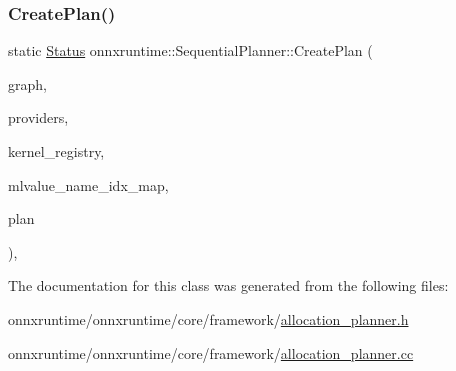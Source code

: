 \subsubsection{\texorpdfstring{Create\+Plan()}{CreatePlan()}\hspace{0.1cm}{\footnotesize\ttfamily [2/2]}}
{\footnotesize\ttfamily static \mbox{\hyperlink{classonnxruntime_1_1common_1_1Status}{Status}} onnxruntime\+::\+Sequential\+Planner\+::\+Create\+Plan (\begin{DoxyParamCaption}\item[{const \mbox{\hyperlink{classonnxruntime_1_1Graph}{onnxruntime\+::\+Graph}} \&}]{graph,  }\item[{const \mbox{\hyperlink{classonnxruntime_1_1ExecutionProviders}{Execution\+Providers}} \&}]{providers,  }\item[{const \mbox{\hyperlink{classonnxruntime_1_1KernelRegistryManager}{Kernel\+Registry\+Manager}} \&}]{kernel\+\_\+registry,  }\item[{const \mbox{\hyperlink{classonnxruntime_1_1MLValueNameIdxMap}{M\+L\+Value\+Name\+Idx\+Map}} \&}]{mlvalue\+\_\+name\+\_\+idx\+\_\+map,  }\item[{std\+::unique\+\_\+ptr$<$ \mbox{\hyperlink{structonnxruntime_1_1SequentialExecutionPlan}{Sequential\+Execution\+Plan}} $>$ \&}]{plan }\end{DoxyParamCaption})\hspace{0.3cm}{\ttfamily [inline]}, {\ttfamily [static]}}



The documentation for this class was generated from the following files\+:\begin{DoxyCompactItemize}
\item 
onnxruntime/onnxruntime/core/framework/\mbox{\hyperlink{allocation__planner_8h}{allocation\+\_\+planner.\+h}}\item 
onnxruntime/onnxruntime/core/framework/\mbox{\hyperlink{allocation__planner_8cc}{allocation\+\_\+planner.\+cc}}\end{DoxyCompactItemize}
